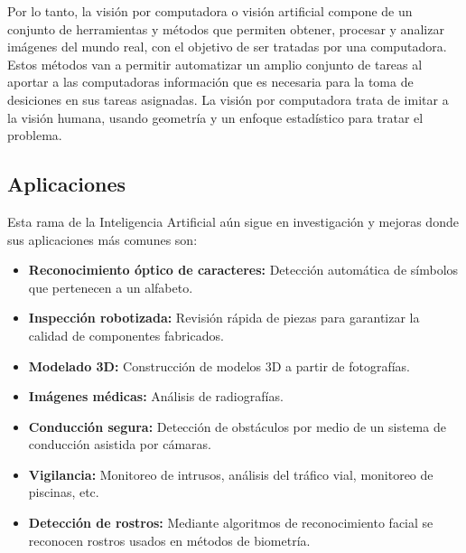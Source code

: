 Por lo tanto, la visión por computadora o visión artificial compone de un conjunto de herramientas y métodos que permiten obtener, procesar y analizar imágenes del mundo real, con el objetivo de ser tratadas por una computadora. Estos métodos van a permitir automatizar un amplio conjunto de tareas al aportar a las computadoras información que es necesaria para la toma de desiciones en sus tareas asignadas. La visión por computadora trata de imitar a la visión humana, usando geometría y un enfoque estadístico para tratar el problema.\\

\subsection{Aplicaciones}
Esta rama de la Inteligencia Artificial aún sigue en investigación y mejoras donde sus aplicaciones más comunes son:

\begin{itemize}
    \item \textbf{Reconocimiento óptico de caracteres:} Detección automática de símbolos que pertenecen a un alfabeto.
    \item \textbf{Inspección robotizada:} Revisión rápida de piezas para garantizar la calidad de componentes fabricados.
    \item \textbf{Modelado 3D:} Construcción de modelos 3D a partir de fotografías.
    \item \textbf{Imágenes médicas:} Análisis de radiografías.
    \item \textbf{Conducción segura:} Detección de obstáculos por medio de un sistema de conducción asistida por cámaras.
    \item \textbf{Vigilancia:} Monitoreo de intrusos, análisis del tráfico vial, monitoreo de piscinas, etc.
    \item \textbf{Detección de rostros:} Mediante algoritmos de reconocimiento facial se reconocen rostros usados en métodos de biometría.
\end{itemize}

